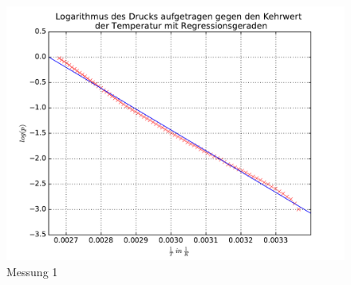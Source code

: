 \documentclass{scrartcl}
\begin{document}
\begin{figure}
  \centering
  \includegraphics[width=\textwidth]{messung1.pdf}
  \caption{Messung 1}
  \label{fig:plot1}
\end{figure}
\end{document}
